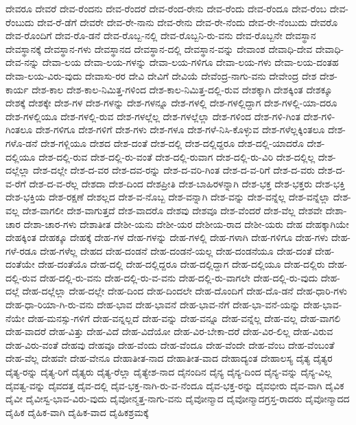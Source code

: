 {ದೇವರೂ
ದೇವರೆ
ದೇವ-ರೆಂದನು
ದೇವ-ರೆಂದರೆ
ದೇವ-ರೆಂದ-ರೇನು
ದೇವ-ರೆಂದು
ದೇವ-ರೆಂದೂ
ದೇವ-ರೆಂಬ
ದೇವ-ರೆಂಬುದು
ದೇವ-ರೆ-ಡೆಗೆ
ದೇವರೇ
ದೇವ-ರೇ-ನಾನು
ದೇವ-ರೇನು
ದೇವ-ರೇ-ನೆಂದು
ದೇವ-ರೇ-ನೆಂಬುದು
ದೇವರೊ
ದೇವ-ರೊಂದಿಗೆ
ದೇವ-ರೊ-ಡನೆ
ದೇವ-ರೊಬ್ಬ-ನಲ್ಲಿ
ದೇವ-ರೊಬ್ಬನಿ-ರು-ವನು
ದೇವ-ರೊಬ್ಬನೇ
ದೇವಸ್ಥಾನ
ದೇವಸ್ಥಾನಕ್ಕೆ
ದೇವಸ್ಥಾನ-ಗಳು
ದೇವಸ್ಥಾನದ
ದೇವಸ್ಥಾನ-ದಲ್ಲಿ
ದೇವಸ್ಥಾನ-ವನ್ನು
ದೇವಾಂಶ
ದೇವಾಧಿ-ದೇವ
ದೇವಾಧಿ-ದೇವ-ನನ್ನು
ದೇವಾ-ಲಯ
ದೇವಾ-ಲಯ-ಗಳನ್ನು
ದೇವಾ-ಲಯ-ಗಳಿಗೂ
ದೇವಾ-ಲಯ-ಗಳು
ದೇವಾ-ಲಯ-ದಂತಹ
ದೇವಾ-ಲಯ-ವಿರು-ವುದು
ದೇವಾಸು-ರರ
ದೇವಿ
ದೇವಿಗೆ
ದೇವಿಯೆ
ದೇವೆಂದ್ರ-ನಾಗು-ವನು
ದೇವೇಂದ್ರ
ದೇಶ
ದೇಶ-ಕಾರ್ಯ
ದೇಶ-ಕಾಲ
ದೇಶ-ಕಾಲ-ನಿಮಿತ್ತ-ಗಳಿಂದ
ದೇಶ-ಕಾಲ-ನಿಮಿತ್ತ-ದಲ್ಲಿ-ರುವ
ದೇಶಕ್ಕಾಗಿ
ದೇಶಕ್ಕಿಂತ
ದೇಶಕ್ಕೂ
ದೇಶಕ್ಕೆ
ದೇಶಕ್ಕೇ
ದೇಶ-ಗಳ
ದೇಶ-ಗಳನ್ನು
ದೇಶ-ಗಳನ್ನೂ
ದೇಶ-ಗಳಲ್ಲಿ
ದೇಶ-ಗಳಲ್ಲಿದ್ದಾಗ
ದೇಶ-ಗಳಲ್ಲಿ-ಯಾ-ದರೂ
ದೇಶ-ಗಳಲ್ಲಿಯೂ
ದೇಶ-ಗಳಲ್ಲಿ-ರುವ
ದೇಶ-ಗಳಲ್ಲೆಲ್ಲ
ದೇಶ-ಗಳಲ್ಲೆಲ್ಲಾ
ದೇಶ-ಗಳಿಂದ
ದೇಶ-ಗಳಿ-ಗಿಂತ
ದೇಶ-ಗಳಿ-ಗಿಂತಲೂ
ದೇಶ-ಗಳಿಗೂ
ದೇಶ-ಗಳಿಗೆ
ದೇಶ-ಗಳು
ದೇಶ-ಗಳೂ
ದೇಶ-ಗಳೆ-ನಿಸಿ-ಕೊಳ್ಳುವ
ದೇಶ-ಗಳೆಲ್ಲಕ್ಕಿಂತಲೂ
ದೇಶ-ಗಳೊ-ಡನೆ
ದೇಶ-ಗಳ್ಲಿಯೂ
ದೇಶದ
ದೇಶ-ದಂತೆ
ದೇಶ-ದಲ್ಲಿ
ದೇಶ-ದಲ್ಲಿದ್ದರೂ
ದೇಶ-ದಲ್ಲಿ-ಯಾದರೊ
ದೇಶ-ದಲ್ಲಿಯೂ
ದೇಶ-ದಲ್ಲಿ-ರುವ
ದೇಶ-ದಲ್ಲಿ-ರು-ವಂತೆ
ದೇಶ-ದಲ್ಲಿ-ರುವಾಗ
ದೇಶ-ದಲ್ಲಿ-ರು-ವಿರಿ
ದೇಶ-ದಲ್ಲಿಲ್ಲ
ದೇಶ-ದಲ್ಲೆಲ್ಲಾ
ದೇಶ-ದಲ್ಲೇ
ದೇಶ-ದ-ವರ
ದೇಶ-ದವ-ರನ್ನು
ದೇಶ-ದ-ವರಿ-ಗಿಂತ
ದೇಶ-ದ-ವ-ರಿಗೆ
ದೇಶ-ದ-ವರು
ದೇಶ-ದ-ವ-ರೆಗೆ
ದೇಶ-ದ-ವ-ರೆಲ್ಲ
ದೇಶದಾ
ದೇಶ-ದಿಂದ
ದೇಶಪ್ರೀತಿ
ದೇಶ-ಬಾಹಿರಳನ್ನಾಗಿ
ದೇಶ-ಭಕ್ತ
ದೇಶ-ಭಕ್ತರು
ದೇಶ-ಭಕ್ತಿ
ದೇಶ-ಭಕ್ತಿಯ
ದೇಶ-ರಕ್ಷಣೆ
ದೇಶಲ್ಲದ
ದೇಶ-ವ-ನೊಬ್ಬ
ದೇಶ-ವನ್ನಾಗಿ
ದೇಶ-ವನ್ನು
ದೇಶ-ವನ್ನೆಲ್ಲ
ದೇಶ-ವನ್ನೆಲ್ಲಾ
ದೇಶ-ವಲ್ಲ
ದೇಶ-ವಾಗಲೀ
ದೇಶ-ವಾಗುತ್ತದೆ
ದೇಶ-ವಾದರೊ
ದೇಶವು
ದೇಶವೂ
ದೇಶ-ವೆಂದರೆ
ದೇಶ-ವೆಲ್ಲ
ದೇಶವೇ
ದೇಶಾ-ಚಾರ
ದೇಶಾ-ಚಾರ-ಗಳು
ದೇಶಾತೀತ
ದೇಶೀ-ಯನು
ದೇಶೀ-ಯರ
ದೇಶೀಯ-ರಾದ
ದೇಶೀ-ಯರು
ದೇಹ
ದೇಹಕ್ಕಾಗಿಯೇ
ದೇಹಕ್ಕಿಂತ
ದೇಹಕ್ಕೂ
ದೇಹಕ್ಕೆ
ದೇಹ-ಗಳ
ದೇಹ-ಗಳನ್ನು
ದೇಹ-ಗಳಲ್ಲಿ
ದೇಹ-ಗಳಾಗಿ
ದೇಹ-ಗಳಿಗೂ
ದೇಹ-ಗಳು
ದೇಹ-ಗಳೆ-ರಡೂ
ದೇಹ-ಗಳೆಲ್ಲ
ದೇಹದ
ದೇಹ-ದಂಡನೆ
ದೇಹ-ದಂಡನೆ-ಯಲ್ಲ
ದೇಹ-ದಂಡನೆಯೂ
ದೇಹ-ದಂತೆ
ದೇಹ-ದಂತೆಯೇ
ದೇಹ-ದಂತೆಯೊ
ದೇಹ-ದಲ್ಲಿ
ದೇಹ-ದಲ್ಲಿದ್ದರೂ
ದೇಹ-ದಲ್ಲಿದ್ದಾಗ
ದೇಹ-ದಲ್ಲಿಯೂ
ದೇಹ-ದಲ್ಲಿರು
ದೇಹ-ದಲ್ಲಿ-ರುವ
ದೇಹ-ದಲ್ಲಿ-ರು-ವನು
ದೇಹ-ದಲ್ಲಿ-ರು-ವ-ವನು
ದೇಹ-ದಲ್ಲಿ-ರು-ವಾಗಲೇ
ದೇಹ-ದಲ್ಲಿ-ರು-ವುದು
ದೇಹ-ದಲ್ಲೆ
ದೇಹ-ದಲ್ಲೆಲ್ಲಾ
ದೇಹ-ದಲ್ಲೇ
ದೇಹ-ದಿಂದ
ದೇಹ-ದಿಂದಲೇ
ದೇಹ-ದೊಂದಿಗೆ
ದೇಹ-ದೊ-ಡನೆ
ದೇಹ-ಧಾರಿ-ಗಳು
ದೇಹ-ಧಾ-ರಿಯಾ-ಗಿ-ರು-ವನು
ದೇಹ-ಭಾವ
ದೇಹ-ಭಾವನೆ
ದೇಹ-ಭಾವ-ನೆಗೆ
ದೇಹ-ಭಾ-ವನೆ-ಯನ್ನು
ದೇಹ-ಭಾವ-ನೆಯೇ
ದೇಹ-ಮನಸ್ಸು-ಗಳಿಗೆ
ದೇಹ-ವನ್ನಲ್ಲದೆ
ದೇಹ-ವನ್ನು
ದೇಹ-ವನ್ನೂ
ದೇಹ-ವನ್ನೆಲ್ಲ
ದೇಹ-ವಲ್ಲ
ದೇಹ-ವಾಗಲಿ
ದೇಹ-ವಾದರೆ
ದೇಹ-ವಿತ್ತು
ದೇಹ-ವಿದೆ
ದೇಹ-ವಿದೆಯೋ
ದೇಹ-ವಿರ-ಬೇಕಾ-ದರೆ
ದೇಹ-ವಿರ-ಲಿಲ್ಲ
ದೇಹ-ವಿರುವ
ದೇಹ-ವಿರು-ವಂತೆ
ದೇಹವು
ದೇಹವೂ
ದೇಹ-ವೆಂದು
ದೇಹ-ವೆಂದೂ
ದೇಹ-ವೆಂದೇ
ದೇಹ-ವೆಂಬ
ದೇಹ-ವೆಂಬಂತೆ
ದೇಹ-ವೆಲ್ಲ
ದೇಹವೇ
ದೇಹ-ವೇನೂ
ದೇಹಾತೀತ-ನಾದ
ದೇಹಾತೀತ-ವಾದ
ದೇಹಾದ್ಯಂತ
ದೇಹಾಲಸ್ಯ
ದೈತ್ಯ
ದೈತ್ಯರ
ದೈತ್ಯ-ರನ್ನು
ದೈತ್ಯ-ರಿಗೆ
ದೈತ್ಯರು
ದೈತ್ಯ-ರೆಲ್ಲಾ
ದೈತ್ಯೇಶ-ನಾದ
ದೈನಂದಿನ
ದೈನ್ಯ
ದೈನ್ಯ-ದಿಂದ
ದೈನ್ಯ-ವನ್ನು
ದೈನ್ಯ-ವಿಲ್ಲ
ದೈವತ್ವ-ವನ್ನು
ದೈವದತ್ತ
ದೈವ-ದಲ್ಲಿ
ದೈವ-ಭಕ್ತ-ನಾಗಿ-ರು-ವ-ನೆಂದೂ
ದೈವ-ಭಕ್ತ-ರನ್ನು
ದೈವಭೀರು
ದೈವ-ವಾಗಿ
ದೈವಿಕ
ದೈವೀ
ದೈವೀಸ್ವ-ಭಾವ-ವಿರು-ವುದು
ದೈವೋನ್ಮತ್ತ-ನಾಗು-ವನು
ದೈವೋನ್ಮಾದ
ದೈವೋನ್ಮಾದಗ್ರಸ್ತ-ರಾದರು
ದೈವೋನ್ಮಾದದ
ದೈಹಿಕ
ದೈಹಿಕ-ವಾಗಿ
ದೈಹಿಕ-ವಾದ
ದೈಹಿಕಶ್ರಮಕ್ಕೆ
}
